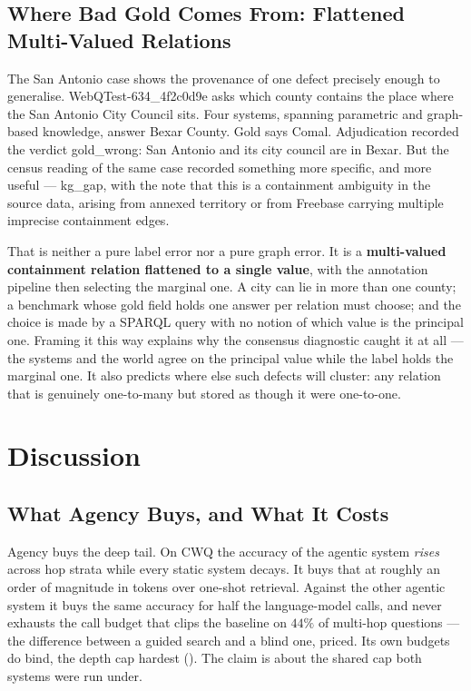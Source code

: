 \subsection{Where Bad Gold Comes From: Flattened Multi-Valued
Relations}\label{sec:gold-provenance}

The San Antonio case shows the provenance of one defect precisely enough
to generalise. \textsf{WebQTest-634\_4f2c0d9e} asks which
county contains the place where the San Antonio City Council sits. Four systems,
spanning parametric and graph-based knowledge, answer Bexar County. Gold says
Comal. Adjudication recorded the verdict \textsf{gold\_wrong}: San Antonio and
its city council are in Bexar. But the census reading of the same case recorded
something more specific, and more useful --- \textsf{kg\_gap}, with the note
that this is a containment ambiguity in the source data, arising from annexed
territory or from Freebase carrying multiple imprecise containment edges.

That is neither a pure label error nor a pure graph error. It is a
\textbf{multi-valued containment relation flattened to a single value}, with the
annotation pipeline then selecting the marginal one. A city can lie in more than
one county; a benchmark whose gold field holds one answer per relation must
choose; and the choice is made by a SPARQL query with no notion of which value
is the principal one. Framing it this way explains why the consensus diagnostic
caught it at all --- the systems and the world agree on the principal value
while the label holds the marginal one. It also predicts where else such
defects will cluster: any relation that is genuinely one-to-many but stored as
though it were one-to-one.

\section{Discussion}\label{sec:discussion}

\subsection{What Agency Buys, and What It Costs}

Agency buys the deep tail. On CWQ the accuracy of the agentic system
\emph{rises} across hop strata while every static system decays. It buys
that at roughly an order of magnitude in tokens over one-shot retrieval. Against
the other agentic system it buys the same accuracy for half the language-model
calls, and never exhausts the call budget that clips the baseline on $44\%$ of
multi-hop questions --- the difference between a guided search and a blind one,
priced. Its own budgets do bind, the depth cap hardest ().
The claim is about the shared cap both systems were run under.

